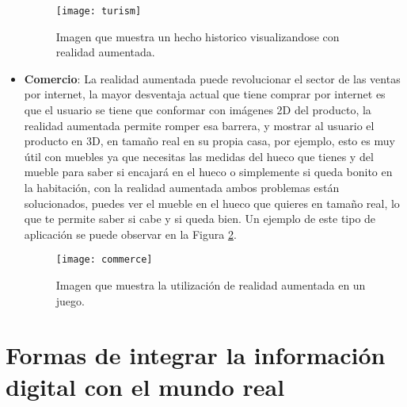 \begin{itemize}
  \begin{figure}[h]
    \centering
    \texttt{[image: turism]}
    \caption{Imagen que muestra un hecho historico visualizandose con realidad aumentada. \cite{layar}}
    \label{figura-turismo}
  \end{figure}

  \newpage

  \item \textbf{Comercio}: La realidad aumentada puede revolucionar el sector de las ventas por internet, la mayor desventaja actual que tiene comprar por internet es que el usuario se tiene que conformar con imágenes 2D del producto, la realidad aumentada permite romper esa barrera, y mostrar al usuario el producto en 3D, en tamaño real en su propia casa, por ejemplo, esto es muy útil con muebles ya que necesitas las medidas del hueco que tienes y del mueble para saber si encajará en el hueco o simplemente si queda bonito en la habitación, con la realidad aumentada ambos problemas están solucionados, puedes ver el mueble en el hueco que quieres en tamaño real, lo que te permite saber si cabe y si queda bien. Un ejemplo de este tipo de aplicación se puede observar en la Figura \ref{figura-comercio}.

  \begin{figure}
    \centering
    \texttt{[image: commerce]}
    \caption{Imagen que muestra la utilización de realidad aumentada en un juego.\protect\footnotemark}
    \label{figura-comercio}
  \end{figure}


\end{itemize}

\newpage

\section{Formas de integrar la información digital con el mundo real \cite{prendes-espinosa}}

